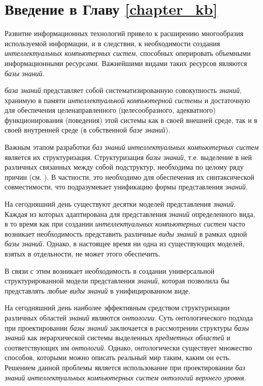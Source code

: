 \section*{Введение в Главу \ref{chapter_kb}}

Развитие информационных технологий привело к расширению многообразия используемой информации, и в следствии, к необходимости создания \textit{интеллектуальных компьютерных систем}, способных оперировать объемными информационными ресурсами. Важнейшими видами таких ресурсов являются \textit{базы знаний}.

\textit{база знаний} представляет собой систематизированную совокупность \textit{знаний}, хранимую в памяти \textit{интеллектуальной компьютерной системы} и достаточную для обеспечения целенаправленного (целесообразного, адекватного) функционирования (поведения) этой системы как в своей внешней среде, так и в своей внутренней среде (в собственной \textit{базе знаний}).

Важным этапом разработки \textit{баз знаний} \textit{интеллектуальных компьютерных систем} является их структуризация. Структуризация \textit{базы знаний}, т.е. выделение в ней различных связанных между собой подструктур, необходима по целому ряду причин (см. ). В частности, это необходимо для обеспечения их синтаксической совместимости, что подразумевает унификацию формы представления \textit{знаний}.

На сегодняшний день существуют десятки моделей представления \textit{знаний}. Каждая из которых адаптирована для представления \textit{знаний} определенного вида, в то время как при создании \textit{интеллектуальных компьютерных систем} часто возникает необходимость представить различные \textit{виды знаний} в рамках одной \textit{базы знаний}. Однако, в настоящее время ни одна из существующих моделей, взятых в отдельности, не может этого обеспечить. 

В связи с этим возникает необходимость в создании универсальной структурированной модели представления \textit{знаний}, которая позволила бы представлять любые \textit{виды знаний} в унифицированном виде.

На сегодняшний день наиболее эффективным средством структуризации различных областей \textit{знаний} являются \textit{онтологии}. Суть онтологического подхода при проектировании \textit{базы знаний} заключается в рассмотрении структуры \textit{базы знаний} как иерархической системы выделенных \textit{предметных областей} и соответствующих им \textit{онтологий}. Однако, онтологически существует множество способов, которыми можно описать реальный мир таким, каким он есть. Решением данной проблемы является использование при проектировании \textit{баз знаний} \textit{интеллектуальных компьютерных систем} \textit{онтологий верхнего уровня}.

